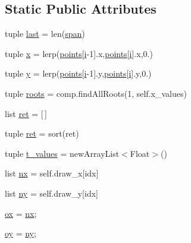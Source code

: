 \subsection*{Static Public Attributes}
\begin{DoxyCompactItemize}
\item 
tuple \hyperlink{classbezier_1_1_bezier_curve_a4570d8b0525d6fb56ffbe338aea5b9a5}{last} = len(\hyperlink{classbezier_1_1_bezier_curve_abd2b09d5ae706c4e31f22b0c199134c0}{span})
\item 
tuple \hyperlink{classbezier_1_1_bezier_curve_a67d3887b8b38085157320f51305db83e}{x} = lerp(\hyperlink{classbezier_1_1_bezier_curve_a6c39346893b0610e98d124f94f098b5b}{points}\mbox{[}\hyperlink{namespacebezier_a928e2d96e49d7898d0f47903caf0f866}{i}-\/1\mbox{]}.x,\hyperlink{classbezier_1_1_bezier_curve_a6c39346893b0610e98d124f94f098b5b}{points}\mbox{[}\hyperlink{namespacebezier_a928e2d96e49d7898d0f47903caf0f866}{i}\mbox{]}.x,0.)
\item 
tuple \hyperlink{classbezier_1_1_bezier_curve_a4daedd276ea223e485036f3ad346b33c}{y} = lerp(\hyperlink{classbezier_1_1_bezier_curve_a6c39346893b0610e98d124f94f098b5b}{points}\mbox{[}\hyperlink{namespacebezier_a928e2d96e49d7898d0f47903caf0f866}{i}-\/1\mbox{]}.y,\hyperlink{classbezier_1_1_bezier_curve_a6c39346893b0610e98d124f94f098b5b}{points}\mbox{[}\hyperlink{namespacebezier_a928e2d96e49d7898d0f47903caf0f866}{i}\mbox{]}.y,0.)
\item 
tuple \hyperlink{classbezier_1_1_bezier_curve_a782e956673f761f25e256f1c2094d54b}{roots} = comp.\+find\+All\+Roots(1, self.\+x\+\_\+values)
\item 
list \hyperlink{classbezier_1_1_bezier_curve_afb7008816c2eb9b266374b543b748b1c}{ret} = \mbox{[}$\,$\mbox{]}
\item 
tuple \hyperlink{classbezier_1_1_bezier_curve_adfebcda73ce613d7f913ed37541348c6}{ret} = sort(ret)
\item 
tuple \hyperlink{classbezier_1_1_bezier_curve_a668f0b24433e3b2c5ef87f69875a10c2}{t\+\_\+values} = new\+Array\+List$<$Float$>$()
\item 
list \hyperlink{classbezier_1_1_bezier_curve_acd0c66cf9592d59635d8f0cd90a6a8e6}{nx} = self.\+draw\+\_\+x\mbox{[}idx\mbox{]}
\item 
list \hyperlink{classbezier_1_1_bezier_curve_a4b765fecb383d8a7bcf7400ed69f5c55}{ny} = self.\+draw\+\_\+y\mbox{[}idx\mbox{]}
\item 
\hyperlink{classbezier_1_1_bezier_curve_af54790f4736706fda65bcc87e24cef1f}{ox} = \hyperlink{classbezier_1_1_bezier_curve_acd0c66cf9592d59635d8f0cd90a6a8e6}{nx};
\item 
\hyperlink{classbezier_1_1_bezier_curve_a5cd7c967702aa92f02a0fafbf1ed719d}{oy} = \hyperlink{classbezier_1_1_bezier_curve_a4b765fecb383d8a7bcf7400ed69f5c55}{ny};
\end{DoxyCompactItemize}


